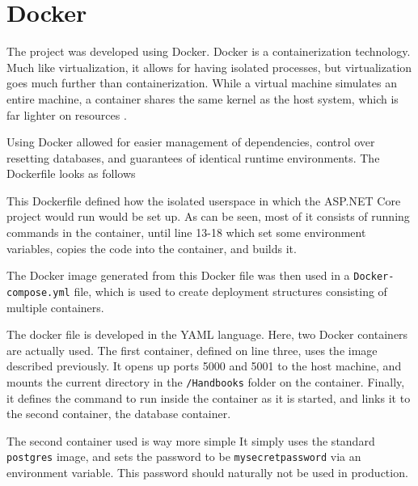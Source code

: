 \section{Docker}
The project was developed using Docker.
Docker is a containerization technology.
Much like virtualization, it allows for having isolated processes, but virtualization goes much further than containerization.
While a virtual machine simulates an entire machine, a container shares the same kernel as the host system, which is far lighter on resources \cite{docker}.


Using Docker allowed for easier management of dependencies, control over resetting databases, and guarantees of identical runtime environments.
The Dockerfile looks as follows

This Dockerfile defined how the isolated userspace in which the ASP.NET Core project would run would be set up.
As can be seen, most of it consists of running commands in the container, until line 13-18 which set some environment variables, copies the code into the container, and builds it.

The Docker image generated from this Docker file was then used in a \texttt{Docker-compose.yml} file, which is used to create deployment structures consisting of multiple containers.

The docker file is developed in the YAML language.
Here, two Docker containers are actually used.
The first container, defined on line three, uses the image described previously.
It opens up ports 5000 and 5001 to the host machine, and mounts the current directory in the \texttt{/Handbooks} folder on the container.
Finally, it defines the command to run inside the container as it is started, and links it to the second container, the database container.

The second container used is way more simple
It simply uses the standard \texttt{postgres} image, and sets the password to be \texttt{mysecretpassword} via an environment variable.
This password should naturally not be used in production.
